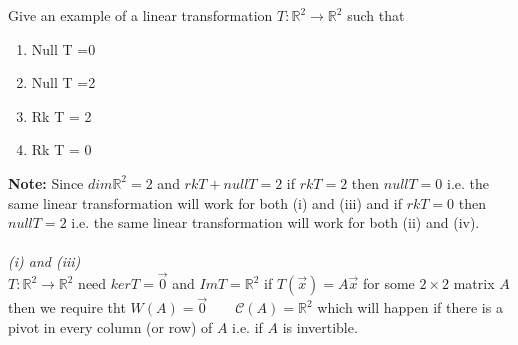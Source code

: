 \documentclass{report}
\begin{document}
    \hline
    Give an example of a linear transformation $ T: \mathbb{R} ^2 \to \mathbb{R} ^2$ such that 
    \begin{enumerate}[label=(\roman*)]
      \item Null T =0
      \item Null T =2
      \item Rk T = 2
      \item Rk T = 0
      \end{enumerate}
       \textbf{Note:} Since $ dim \mathbb{R}^2 =2$ and $ rk T + null T = 2$ if $ rk T =2 $ then $ null T = 0$ i.e. the same linear transformation will work for both (i) and (iii) and if $ rk T =0$ then $ null T = 2$ i.e. the same linear transformation will work for both (ii) and (iv).\\
       \\
       \textit{ (i) and (iii) }\\
       $ T : \mathbb{R} ^2 \to \mathbb{R} ^2$ need $ ker T = { \vec{ 0} }$ and $ Im T = \mathbb{R} ^2$ if $ T \left(  \vec{ x}  \right) = A \vec{ x} $ for some $ 2 \times  2$  matrix $ A$ then we require tht $ W \left( A \right) = {\vec{ 0} } \qquad  \mathcal{C} \left( A \right) = \mathbb{R} ^2$ which will happen if there is a pivot in every column (or row) of $ A$  i.e.  if $ A$ is invertible.\\
    
\end{document}
